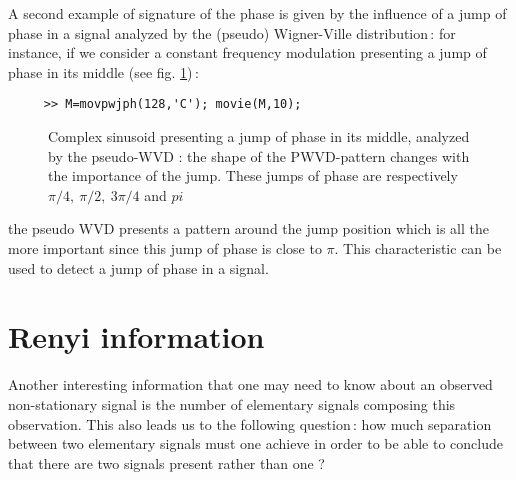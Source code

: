   A second example of signature of the phase is given by the influence of a
jump of phase in a signal analyzed by the (pseudo) Wigner-Ville
distribution\,: for instance, if we consider a constant frequency
modulation presenting a jump of phase in its middle (see
fig. \ref{Ex1fig2})\,: 
\begin{verbatim}
     >> M=movpwjph(128,'C'); movie(M,10);
\end{verbatim}
\begin{figure}[htb]
\epsfxsize=10cm
\epsfysize=10cm
\centerline{}
\caption{\label{Ex1fig2}Complex sinusoid presenting a jump of phase in its
middle, analyzed by the pseudo-WVD : the shape of the PWVD-pattern changes
with the importance of the jump. These jumps of phase are respectively $\pi/4,\
\pi/2,\ 3\pi/4$ and $pi$}
\end{figure}
the pseudo WVD presents a pattern around the jump position which is
all the more important since this jump of phase is close to $\pi$. This
characteristic can be used to detect a jump of phase in a signal.


\section{Renyi information}
  Another interesting information that one may need to know about an
observed non-stationary signal is the number of elementary signals
composing this observation. This also leads us to the following question\,:
how much separation between two elementary signals must one achieve in
order to be able to conclude that there are two signals present rather than
one ? 

